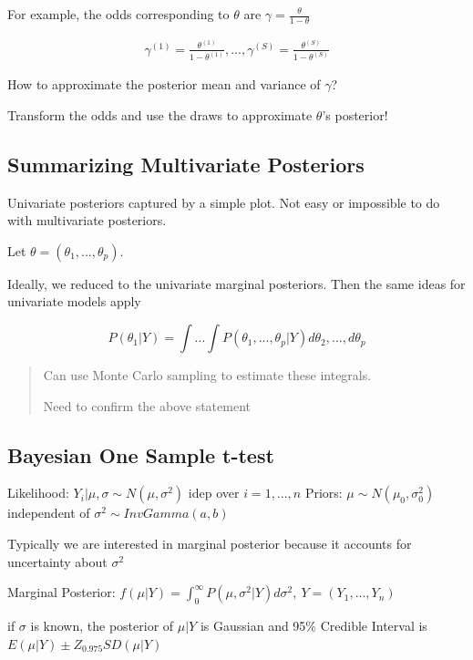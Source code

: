 \documentclass[11pt]{article}
\begin{document}
For example, the odds corresponding to \(\theta\) are \(\gamma = \frac{\theta}{1 - \theta}\)

\begin{equation}
\begin{split}
\gamma^{(1)} = \frac{\theta^{(1)}}{1 - \theta^{(1)}}, ..., \gamma^{(S)} = \frac{\theta^{(S)}}{1 - \theta^{(S)}}
\end{split}
\end{equation}

How to approximate the posterior mean and variance of \(\gamma\)?

Transform the odds and use the draws to approximate \(\theta\)'s posterior!

\subsection{Summarizing Multivariate Posteriors}
\label{sec:org870d8fc}

Univariate posteriors captured by a simple plot. Not easy or impossible to do
with multivariate posteriors.

Let \(\theta = (\theta_1, ..., \theta_p)\).

Ideally, we reduced to the univariate marginal posteriors. Then the same ideas
for univariate models apply

$$
P(\theta_1 | Y) = \int ... \int P(\theta_1, ..., \theta_p | Y) d \theta_2, ...,
d \theta_p
$$

\begin{quote}
Can use Monte Carlo sampling to estimate these integrals.

Need to confirm the above statement
\end{quote}

\subsection{Bayesian One Sample t-test}
\label{sec:orgc9f34ac}

Likelihood: \(Y_i | \mu, \sigma \sim N(\mu, \sigma^2)\) idep over \(i = 1, ..., n\)
Priors: \(\mu \sim N(\mu_0, \sigma_0^2)\) independent of \(\sigma^2 \sim InvGamma(a, b)\)

Typically we are interested in marginal posterior because it accounts for uncertainty about \(\sigma^2\)

Marginal Posterior: \(f(\mu | Y) = \int_{0}^{\infty} P(\mu, \sigma^2 | Y) d \sigma^2, \ Y = (Y_1, ..., Y_n)\)

if \(\sigma\) is known, the posterior of \(\mu | Y\) is Gaussian and 95\% Credible
Interval is \(E(\mu | Y) \pm Z_{0.975} SD(\mu | Y)\)
\end{document}
